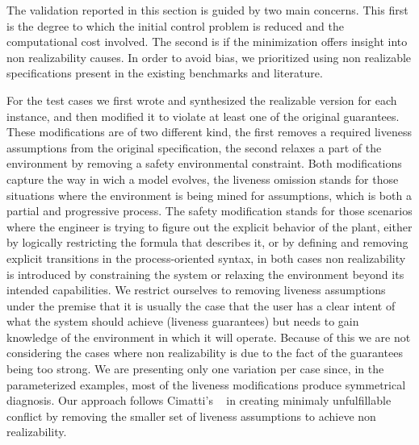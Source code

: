 The validation reported in this section is guided by two main concerns.  This first is the degree to which the initial control problem is reduced and the computational cost involved. The second is if the minimization offers insight into non realizability causes.
In order to avoid bias, we prioritized using non realizable specifications present in the existing benchmarks and literature.

For the test cases we first wrote and synthesized the realizable version for each instance, and then modified it
to violate at least one of the original guarantees. 
These modifications are of two different kind, the first removes a required liveness assumptions from the original specification, the second relaxes a part of the environment by removing a safety environmental constraint. Both modifications capture the way in wich a model evolves, the liveness omission stands for those situations where the environment is being mined for assumptions, which is both a partial and progressive process. The safety modification stands for those scenarios where the engineer is trying to figure out the explicit behavior of the plant, either by logically restricting the formula that describes it, or by defining and removing explicit transitions in the process-oriented syntax, in both cases non realizability is introduced by constraining the system or relaxing the environment beyond its intended capabilities. We restrict ourselves to removing liveness assumptions under the premise that it is usually the case that the user has a clear intent of what the system should achieve (liveness guarantees) but needs to gain knowledge of the environment in which it will operate.  Because of this we are not considering the cases where non realizability is due to the fact of the guarantees being too strong. We are presenting only one variation per case since, in the parameterized examples, most of the liveness modifications produce symmetrical diagnosis. Our approach follows Cimatti's ~\cite{DBLP:conf/vmcai/CimattiRST08} in creating minimaly unfulfillable conflict by removing the smaller set of liveness assumptions to achieve non realizability.
 
